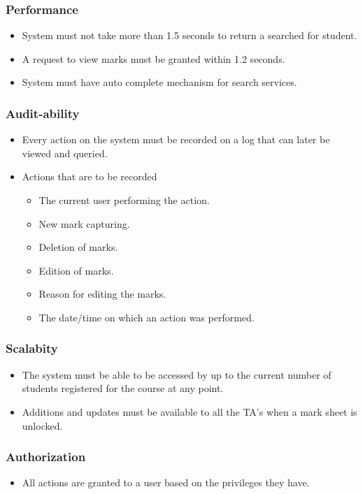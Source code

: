 \documentclass[11pt,a4paper]{article}
\begin{document}
\subsubsection{Performance}
	\begin{itemize}
	\item System must not take more than 1.5 seconds to return a searched for student.
	\item A request to view marks must be granted within 1.2 seconds.
	\item System must have auto complete mechanism for search services.
	\end{itemize}
	
	\subsubsection{Audit-ability}
	\begin{itemize}
	\item Every action on the system must be recorded on a log that can later be viewed and queried.
	\item Actions that are to be recorded
	\begin{itemize}
	\item The current user performing the action.
	\item New mark capturing.
	\item Deletion of marks.
	\item Edition of marks.
	\item Reason for editing the marks.
	\item The date/time on which an action was performed.
	\end{itemize}
	\end{itemize}
	
\subsubsection{Scalabity}
	\begin{itemize}
	\item The system must be able to be accessed by up to the current number of students registered for the course at any point.
	\item Additions and updates must be available to all the TA's when a mark sheet is unlocked.
	\end{itemize}	
	
	\subsubsection{Authorization}
	\begin{itemize}
	\item All actions are granted to a user based on the privileges they have.
	\end{itemize}
	
\end{document}
